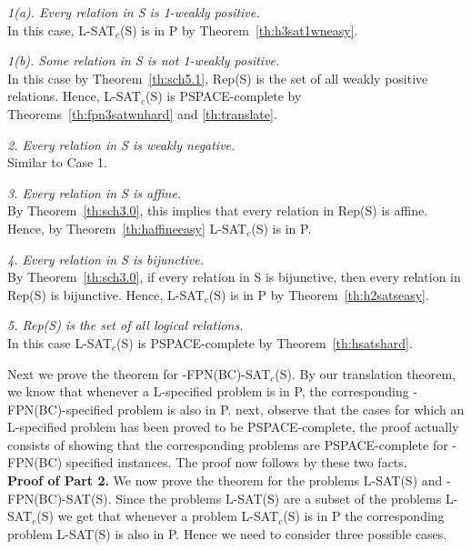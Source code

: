 {\em  1(a). Every relation in {\sf S} is 1-weakly positive.}\\
In this case, 
{\sf L-SAT$_c$(S)} is in {\sf P} by Theorem~\ref{th:h3sat1wneasy}.

{\em   1(b). Some relation in {\sf S} is not 1-weakly positive.}\\
In this case by Theorem~\ref{th:sch5.1}, 
{\sf Rep(S)} is the set of all weakly positive relations.
Hence, {\sf L-SAT$_c$(S)} 
is {\sf PSPACE}-complete by Theorems~\ref{th:fpn3satwnhard}
and \ref{th:translate}.

\noindent
{\em 2. Every relation in {\sf S} is weakly negative.}\\
Similar to Case 1.

\noindent
{\em 3. Every relation in {\sf S} is affine.}\\
By Theorem~\ref{th:sch3.0}, this implies that
every relation in {\sf Rep(S)} is affine. Hence, 
by Theorem~\ref{th:haffineeasy}
{\sf L-SAT$_c$(S)} is in {\sf P}. 

\noindent
{\em 4.  Every relation in {\sf S} is bijunctive.}\\
By Theorem~\ref{th:sch3.0}, if every relation in {\sf S} is bijunctive,
then every relation in {\sf Rep(S)} is bijunctive. Hence, {\sf L-SAT$_c$(S)} 
is in {\sf P}  by Theorem~\ref{th:h2satseasy}.

\noindent
{\em 5. {\sf Rep(S)} is the set of all logical relations.}\\
In this case {\sf L-SAT$_c$(S)} 
is {\sf PSPACE}-complete by Theorem~\ref{th:hsatshard}.


Next we prove the theorem for {-FPN(BC)-SAT$_c$(S)}.
By our translation theorem, we know that whenever a {\sf L}-specified
problem is in {\sf P}, the corresponding {-FPN(BC)}-specified problem 
is also in {\sf P}.
next, observe that the cases for which an L-specified problem has been
proved to be {\sf PSPACE}-complete, the proof actually consists of showing that
the corresponding problems are {\sf PSPACE}-complete for {-FPN(BC)} 
specified instances. The proof now follows by these two facts.\\



\noindent
{\bf Proof of Part 2.}
We now prove the theorem for the problems {\sf L-SAT(S)} and
{-FPN(BC)-SAT(S)}.  Since the problems
{\sf L-SAT(S)} are a subset of the problems {\sf L-SAT$_c$(S)} 
we get that whenever a problem {\sf L-SAT$_c$(S)} is  in 
P the corresponding problem {\sf L-SAT(S)} is also
in {\sf P}. Hence we need to consider three possible cases.

